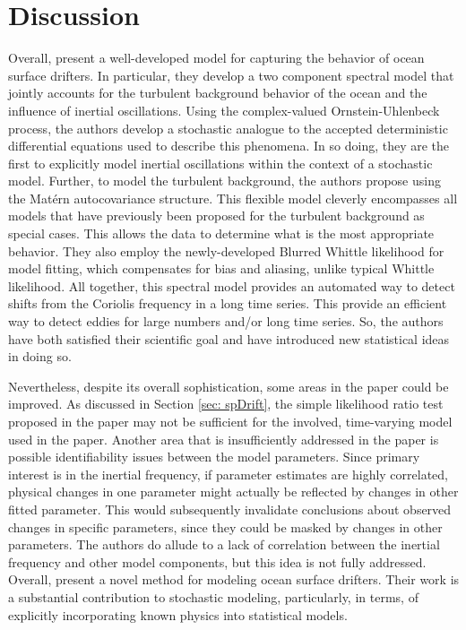 \documentclass{stat572Style}
\begin{document}
\section{Discussion}
\par Overall, \citet{Sykulski2016} present a  well-developed model for capturing the behavior of ocean surface drifters.
 In particular, they develop a two component spectral model that jointly accounts for the turbulent background behavior of the ocean and the influence of inertial oscillations. 
 Using the complex-valued Ornstein-Uhlenbeck process, the authors develop a stochastic analogue to the accepted deterministic differential equations used to describe this phenomena. 
 In so doing, they are the first to explicitly model inertial oscillations within the context of a stochastic model. 
 Further, to model the turbulent background, the authors propose using the  Mat\'{e}rn autocovariance structure.
  This flexible model cleverly encompasses all models that have previously been proposed for the turbulent background as special cases.
  This allows the data to determine what is the most appropriate behavior. 
   They also employ the newly-developed Blurred Whittle likelihood for model fitting, which compensates for bias and aliasing, unlike typical Whittle likelihood. 
   All together, this spectral model provides an automated way to detect shifts from the Coriolis frequency in a long time series. 
This provide an efficient way to detect eddies for large numbers and/or long time series. 
So, the authors have both satisfied their scientific goal and have introduced new statistical ideas in doing so.

Nevertheless, despite its overall sophistication, some areas in the paper could be improved. 
As discussed in Section \ref{sec: spDrift}, the simple likelihood ratio test proposed in the paper may not be sufficient for the involved, time-varying model used in the paper.  
Another area that is insufficiently addressed in the paper is possible identifiability issues between the model parameters. 
Since primary interest is in the inertial frequency, if parameter estimates are highly correlated, physical changes in one parameter might actually be reflected by changes in other fitted parameter.
 This would subsequently invalidate conclusions about observed changes in specific parameters, since they could be masked by changes in other parameters. 
 The authors do allude to a lack of correlation between the inertial frequency and other model components, but this idea is not fully addressed.
Overall, \citet{Sykulski2016} present a novel method for modeling ocean surface drifters.
 Their work is a substantial contribution to stochastic modeling, particularly, in terms, of explicitly incorporating known physics into statistical models. 
\end{document}
